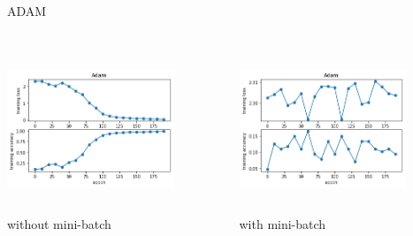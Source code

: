 \documentclass{beamer}
\begin{document}
\begin{frame}{ADAM}
 \begin{columns}
    \begin{column}{0.47\textwidth}
          \includegraphics[width=5cm,height=5cm,angle=0]{adam_mini.png}\\
          \centering
          without mini-batch
    \end{column}
    \begin{column}{0.47\textwidth}
          \includegraphics[width=5cm,height=5cm,angle=0]{adam.png}\\
          \centering
          with mini-batch
    \end{column}
 \end{columns}
\end{frame}
\end{document}
